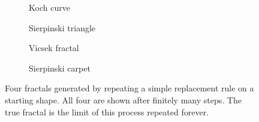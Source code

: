 \documentclass{ftndiplomski}
\begin{document}
\begin{figure}[H]
  \centering
  \begin{subfigure}[b]{0.45\textwidth}
    \centering
    \begin{tikzpicture}[x=5cm,y=5cm]
      
    \end{tikzpicture}
    \caption{Koch curve}
  \end{subfigure}
  \hfill
  \begin{subfigure}[b]{0.45\textwidth}
    \centering
    \begin{tikzpicture}[x=5cm,y=5cm]
      
    \end{tikzpicture}
    \caption{Sierpinski triangle}
  \end{subfigure}

  \vspace{1em}

  \begin{subfigure}[b]{0.45\textwidth}
    \centering
    \begin{tikzpicture}[x=5cm,y=5cm]
      
    \end{tikzpicture}
    \caption{Vicsek fractal}
  \end{subfigure}
  \hfill
  \begin{subfigure}[b]{0.45\textwidth}
    \centering
    \begin{tikzpicture}[x=5cm,y=5cm]
      
    \end{tikzpicture}
    \caption{Sierpinski carpet}
  \end{subfigure}
  \caption{Four fractals generated by repeating a simple replacement rule on a starting shape. All
    four are shown after finitely many steps. The true fractal is the limit of this process
    repeated forever.}
  \label{fig:fractal-examples}
\end{figure}
\end{document}
